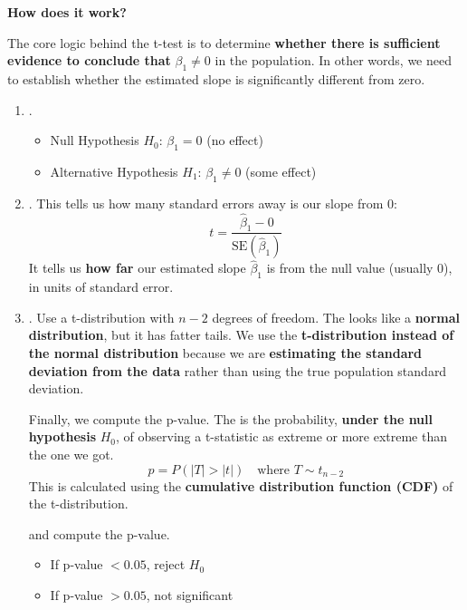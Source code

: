 \highspace
\begin{flushleft}
    \textcolor{Green3}{ \textbf{How does it work?}}
\end{flushleft}
The core logic behind the t-test is to determine \textbf{whether there is sufficient evidence to conclude that} $\beta_1 \ne 0$ in the population. In other words, we need to establish whether the estimated slope is significantly different from zero.
\begin{enumerate}
    \item {}.
    \begin{itemize}
        \item Null Hypothesis $H_0$: $\beta_1 = 0$ (no effect)
        \item Alternative Hypothesis $H_1$: $\beta_1 \ne 0$ (some effect)
    \end{itemize}


    \item {}. This tells us how many standard errors away is our slope from 0:
    \begin{equation}
        t = \dfrac{\hat{\beta}_1 - 0}{\text{SE}\left(\hat{\beta}_1\right)}
    \end{equation}
    It tells us \textbf{how far} our estimated slope $\hat{\beta}_1$ is from the null value (usually 0), in units of standard error.


    \item {}. Use a t-distribution with $n-2$ degrees of freedom. The  looks like a \textbf{normal distribution}, but it has fatter tails. We use the \textbf{t-distribution instead of the normal distribution} because we are \textbf{estimating the standard deviation from the data} rather than using the true population standard deviation.
    
    Finally, we compute the p-value. The  is the probability, \textbf{under the null hypothesis} $H_0$, of observing a t-statistic as extreme or more extreme than the one we got.
    \begin{equation}
        p = P\left(\left|T\right| > \left|t\right|\right) \quad \text{where } T \sim t_{n-2}
    \end{equation}
    This is calculated using the \textbf{cumulative distribution function (CDF)} of the t-distribution.
    
    and compute the p-value.
    \begin{itemize}
        \item If p-value $< 0.05$, reject $H_0$
        \item If p-value $> 0.05$, not significant
    \end{itemize}
\end{enumerate}